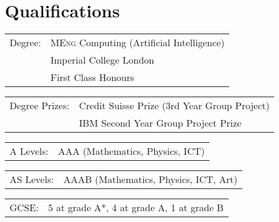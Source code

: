 \section*{Qualifications}

\begin{tabular}{R{3cm} l}

Degree: & \textsc{MEng} Computing (Artificial Intelligence)\\
 & Imperial College London\\
 & First Class Honours

\end{tabular}

\begin{tabular}{R{3cm} l}
Degree Prizes: & Credit Suisse Prize (3rd Year Group Project)\\
 & IBM Second Year Group Project Prize

\end{tabular}


\begin{tabular}{R{3cm} l}	

A Levels: & AAA (Mathematics, Physics, ICT)

\end{tabular}

\begin{tabular}{R{3cm} l}	
AS Levels: & AAAB (Mathematics, Physics, ICT, Art)
\end{tabular}

\begin{tabular}{R{3cm} l}	
GCSE: & 5 at grade A*, 4 at grade A, 1 at grade B
\end{tabular}